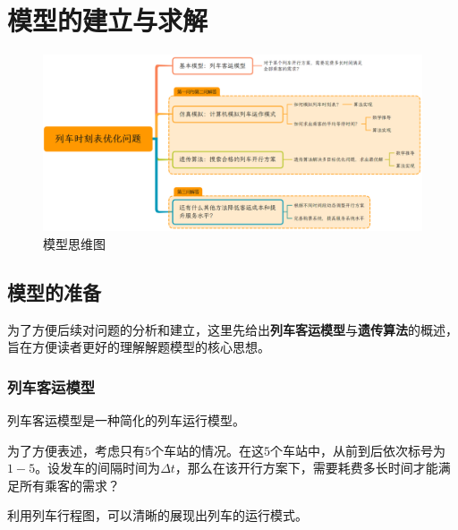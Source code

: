 %
%

\section{模型的建立与求解}

\begin{figure}[h]
    \centering
    \includegraphics[scale=0.2]{res/figure161100.png}
    \caption{模型思维图}
\end{figure}


\subsection{模型的准备}

为了方便后续对问题的分析和建立，这里先给出\textbf{列车客运模型}与\textbf{遗传算法}的概述，旨在方便读者更好的理解解题模型的核心思想。

\subsubsection{列车客运模型}

列车客运模型是一种简化的列车运行模型。

为了方便表述，考虑只有$5$个车站的情况。在这$5$个车站中，从前到后依次标号为$1-5$。设发车的间隔时间为$\Delta t$，那么在该开行方案下，需要耗费多长时间才能满足所有乘客的需求？

利用列车行程图，可以清晰的展现出列车的运行模式。

